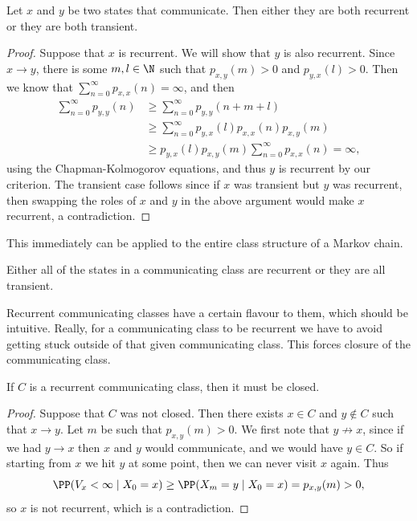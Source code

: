 \begin{theorem}
	Let $x$ and $y$ be two states that communicate. Then either they are both recurrent or they are both transient.
\end{theorem}
\begin{proof}
	Suppose that $x$ is recurrent. We will show that $y$ is also recurrent. Since $x \rightarrow y$, there is some $m, l \in \N$ such that $p_{x, y}(m) > 0$ and $p_{y, x}(l) > 0$. Then we know that $\sum_{n = 0}^{\infty} p_{x, x}(n) = \infty$, and then
	\begin{align*}
	\sum_{n = 0}^{\infty} p_{y, y}(n) 
	&\geq \sum_{n = 0}^{\infty} 
	p_{y, y}(n + m + l) \\ 
	&\geq \sum_{n = 0}^{\infty} p_{y, x}(l) p_{x, x}(n) p_{x, y}(m)  \\
	&\geq p_{y, x}(l) p_{x, y}(m) \sum_{n = 0}^{\infty} p_{x, x}(n) = \infty,
	\end{align*}
	using the Chapman-Kolmogorov equations, and thus $y$ is recurrent by our criterion. The transient case follows since if $x$ was transient but $y$ was recurrent, then swapping the roles of $x$ and $y$ in the above argument would make $x$ recurrent, a contradiction.
\end{proof}

This immediately can be applied to the entire class structure of a Markov chain.

\begin{corollary}
	Either all of the states in a communicating class are recurrent or they are all transient.
\end{corollary}

Recurrent communicating classes have a certain flavour to them, which should be intuitive. Really, for a communicating class to be recurrent we have to avoid getting stuck outside of that given communicating class. This forces closure of the communicating class.

\begin{theorem}
	If $C$ is a recurrent communicating class, then it must be closed.
\end{theorem}
\begin{proof}
	Suppose that $C$ was not closed. Then there exists $x \in C$ and $y \not \in C$ such that $x \rightarrow y$. Let $m$ be such that $p_{x, y}(m) > 0$. We first note that $y \not \rightarrow x$, since if we had $y \rightarrow x$ then $x$ and $y$ would communicate, and we would have $y \in C$. So if starting from $x$ we hit $y$ at some point, then we can never visit $x$ again. Thus
	$$
	\PP(V_x < \infty \mid X_0 = x) \geq \PP(X_m = y \mid X_0 = x) = p_{x, y}(m) > 0,
	$$
	so $x$ is not recurrent, which is a contradiction.
\end{proof}

